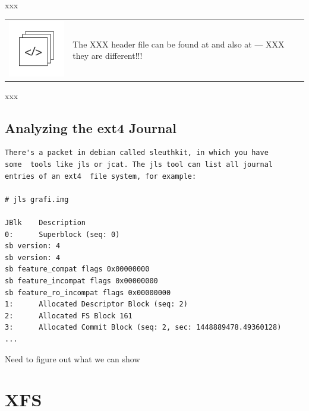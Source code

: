 \noindent
xxx

\begin{table}[h]
\begin{tabular}{ll}
\parbox[l]{0.6in}{\includegraphics[scale=0.8]{figures/src-xref.pdf}} & \parbox[l]{4in}{\small{The XXX header file can be found at  and also at  --- XXX they are different!!!}}
\end{tabular}
\end{table}

\noindent
xxx


\subsection{Analyzing the ext4 Journal}

\begin{lstlisting}
There's a packet in debian called sleuthkit, in which you have 
some  tools like jls or jcat. The jls tool can list all journal 
entries of an ext4  file system, for example:

# jls grafi.img

JBlk    Description
0:      Superblock (seq: 0)
sb version: 4
sb version: 4
sb feature_compat flags 0x00000000
sb feature_incompat flags 0x00000000
sb feature_ro_incompat flags 0x00000000
1:      Allocated Descriptor Block (seq: 2)
2:      Allocated FS Block 161
3:      Allocated Commit Block (seq: 2, sec: 1448889478.49360128)
...
\end{lstlisting}

Need to figure out what we can show



\section{XFS}

